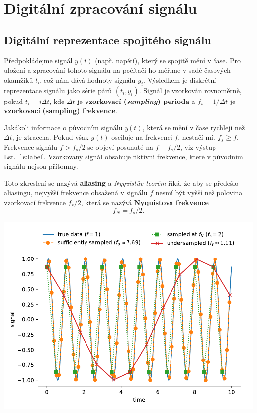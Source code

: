 \newpage
\section{Digitální zpracování signálu}
\subsection{Digitální reprezentace spojitého signálu}
Předpokládejme signál $y(t)$ (např. napětí), který se spojitě mění v čase. Pro uložení a zpracování tohoto signálu na počítači ho měříme v sadě časových okamžiků $t_i$, což nám dává hodnoty signálu $y_i$. Výsledkem je diskrétní reprezentace signálu jako série párů $(t_i, y_i)$. Signál je vzorkován rovnoměrně, pokud $t_i = i\Delta t$, kde $\Delta t$ je \textbf{vzorkovací (\emph{sampling}) perioda} a $f_s = 1/\Delta t$ je \textbf{vzorkovací (\textbf{sampling}) frekvence}.

Jakákoli informace o původním signálu $y(t)$, která se mění v čase rychleji než $\Delta t$, je ztracena. Pokud však $y(t)$ osciluje na frekvenci $f$, nestačí mít $f_s \geq f$. Frekvence signálu $f > f_s/2$ se objeví posunuté na $f - f_s/2$, viz výstup Lst.~\ref{ls:label}. Vzorkovaný signál obsahuje fiktivní frekvence, které v původním signálu nejsou přítomny.

Toto zkreslení se nazývá \textbf{aliasing} a \emph{Nyquistův teorém} říká, že aby se předešlo aliasingu, nejvyšší frekvence obsažená v signálu $f$ nesmí být vyšší než polovina vzorkovací frekvence $f_s/2$, která se nazývá \textbf{Nyquistova frekvence}
\begin{equation}
    \label{eq:nqyust}
    f_N = f_s/2.
\end{equation}


\begin{center}
    \includegraphics[width=0.75\linewidth]{sampling.pdf}
\end{center}

